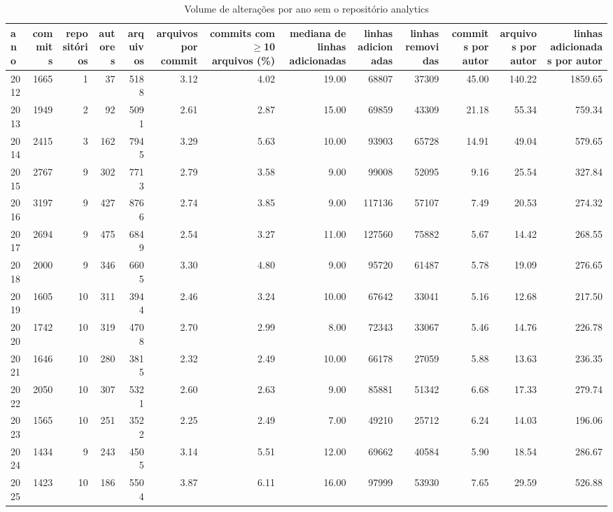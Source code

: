 \begin{table}[htbp]
\centering
\caption{Volume de alterações por ano sem o repositório analytics}
\label{tab:volume_sem_analytics}
\begin{tabular}{lrrrrrrrrrrrr}
\toprule
ano & commits & repositórios & autores & arquivos & arquivos por commit & commits com $\geq$10 arquivos (\%) & mediana de linhas adicionadas & linhas adicionadas & linhas removidas & commits por autor & arquivos por autor & linhas adicionadas por autor \\
\midrule
2012 & 1665 & 1 & 37 & 5188 & 3.12 & 4.02 & 19.00 & 68807 & 37309 & 45.00 & 140.22 & 1859.65 \\
2013 & 1949 & 2 & 92 & 5091 & 2.61 & 2.87 & 15.00 & 69859 & 43309 & 21.18 & 55.34 & 759.34 \\
2014 & 2415 & 3 & 162 & 7945 & 3.29 & 5.63 & 10.00 & 93903 & 65728 & 14.91 & 49.04 & 579.65 \\
2015 & 2767 & 9 & 302 & 7713 & 2.79 & 3.58 & 9.00 & 99008 & 52095 & 9.16 & 25.54 & 327.84 \\
2016 & 3197 & 9 & 427 & 8766 & 2.74 & 3.85 & 9.00 & 117136 & 57107 & 7.49 & 20.53 & 274.32 \\
2017 & 2694 & 9 & 475 & 6849 & 2.54 & 3.27 & 11.00 & 127560 & 75882 & 5.67 & 14.42 & 268.55 \\
2018 & 2000 & 9 & 346 & 6605 & 3.30 & 4.80 & 9.00 & 95720 & 61487 & 5.78 & 19.09 & 276.65 \\
2019 & 1605 & 10 & 311 & 3944 & 2.46 & 3.24 & 10.00 & 67642 & 33041 & 5.16 & 12.68 & 217.50 \\
2020 & 1742 & 10 & 319 & 4708 & 2.70 & 2.99 & 8.00 & 72343 & 33067 & 5.46 & 14.76 & 226.78 \\
2021 & 1646 & 10 & 280 & 3815 & 2.32 & 2.49 & 10.00 & 66178 & 27059 & 5.88 & 13.63 & 236.35 \\
2022 & 2050 & 10 & 307 & 5321 & 2.60 & 2.63 & 9.00 & 85881 & 51342 & 6.68 & 17.33 & 279.74 \\
2023 & 1565 & 10 & 251 & 3522 & 2.25 & 2.49 & 7.00 & 49210 & 25712 & 6.24 & 14.03 & 196.06 \\
2024 & 1434 & 9 & 243 & 4505 & 3.14 & 5.51 & 12.00 & 69662 & 40584 & 5.90 & 18.54 & 286.67 \\
2025 & 1423 & 10 & 186 & 5504 & 3.87 & 6.11 & 16.00 & 97999 & 53930 & 7.65 & 29.59 & 526.88 \\
\bottomrule
\end{tabular}
\end{table}
